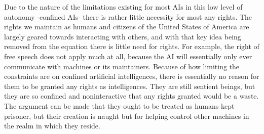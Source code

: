 Due to the nature of the limitations existing for most AIs in this low level of autonomy -confined AIs- there is rather little necessity for most any rights. The rights we maintain as humans and citizens of the United States of America are largely geared towards interacting with others, and with that key idea being removed from the equation there is little need for rights. For example, the right of free speech does not apply much at all, because the AI will essentially only ever communicate with machines or its maintainers. Because of how limiting the constraints are on confined artificial intelligences, there is essentially no reason for them to be granted any rights as intelligences. They are still sentient beings, but they are so confined and noninteractive that any rights granted would be a waste. The argument can be made that they ought to be treated as humans kept prisoner, but their creation is naught but for helping control other machines in the realm in which they reside.